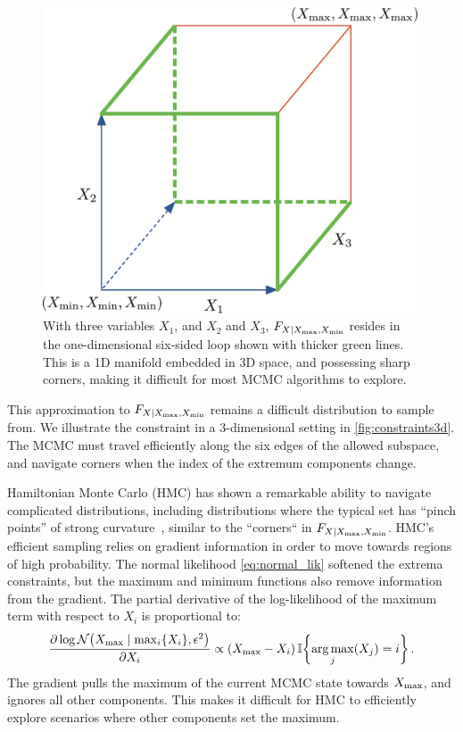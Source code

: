 \documentclass[12pt]{article}
\begin{document}
\begin{figure}[tbp]
\centering
\includegraphics[height=0.3\textheight,width=0.99\textwidth,keepaspectratio]{../figures/constraints3d.png}
\caption{\label{fig:constraints3d}
With three variables \(X_1\), and \(X_2\) and \(X_3\), \(F_{X \mid X_{\max},X_{\min}}\) resides in the one-dimensional six-sided loop shown with thicker green lines. This is a 1D manifold embedded in 3D space, and possessing sharp corners, making it difficult for most MCMC algorithms to explore.}
\end{figure}

This approximation to \(F_{X \mid X_{\max},X_{\min}}\) remains a difficult distribution to sample from.
We illustrate the constraint in a 3-dimensional setting in \autoref{fig:constraints3d}.
The MCMC must travel efficiently along the six edges of the allowed subspace,
and navigate corners when the index of the extremum components change.

Hamiltonian Monte Carlo (HMC) has shown a remarkable ability to navigate complicated distributions, including distributions where the typical set has ``pinch points'' of strong
curvature~\citep{betancourt2017conceptual}, similar to the ``corners`` in \(F_{X \mid X_{\max},X_{\min}}\).
HMC's efficient sampling relies on gradient information in order to move towards regions of high probability.
The normal likelihood \autoref{eq:normal_lik} softened the extrema constraints,
but the maximum and minimum functions also remove information from the gradient.
The partial derivative of the log-likelihood of the maximum term with respect to \(X_i\) is proportional to:
\begin{equation}
\frac{\partial \log \normal\del{\Xmax \mid \max_i\cbr{X_i}, \epsilon^2}}{\partial X_i} \propto \del{\Xmax - X_i} \Ind\cbr{\argmax_j\del{X_j} = i} \,.
\end{equation}
The gradient pulls the maximum of the current MCMC state towards \(X_{\max}\),
and ignores all other components.
This makes it difficult for HMC to efficiently explore scenarios where other components set the maximum.
\end{document}
